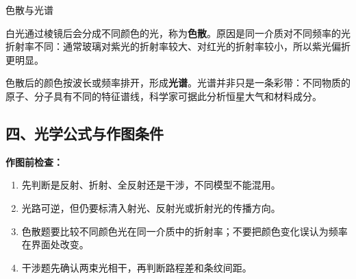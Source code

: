 \begin{conceptbox}{色散与光谱}

白光通过棱镜后会分成不同颜色的光，称为\textbf{色散}。原因是同一介质对不同频率的光折射率不同：通常玻璃对紫光的折射率较大、对红光的折射率较小，所以紫光偏折更明显。

\begin{center}


\label{fig:prism-dispersion}
\end{center}

色散后的颜色按波长或频率排开，形成\textbf{光谱}。光谱并非只是一条彩带：不同物质的原子、分子具有不同的特征谱线，科学家可据此分析恒星大气和材料成分。
\end{conceptbox}

\begin{samepage}
\section*{四、光学公式与作图条件}

\textbf{作图前检查：}
\nopagebreak[4]
\begin{enumerate}
  \item 先判断是反射、折射、全反射还是干涉，不同模型不能混用。
  \item 光路可逆，但仍要标清入射光、反射光或折射光的传播方向。
  \item 色散题要比较不同颜色光在同一介质中的折射率；不要把颜色变化误认为频率在界面处改变。
  \item 干涉题先确认两束光相干，再判断路程差和条纹间距。
\end{enumerate}
\end{samepage}

